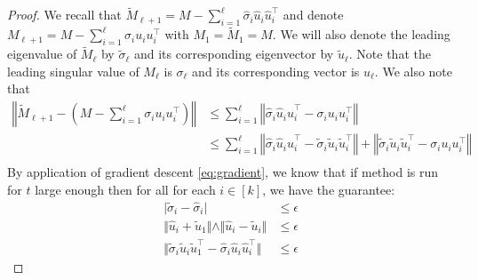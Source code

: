 \begin{proof}
    We recall that $\tilde{M}_{\ell+1} = M - \sum_{i=1}^\ell \hat{\sigma}_{i} \hat{u}_i \hat{u}_i^\top$ and denote $M_{\ell+1} = M - \sum_{i=1}^\ell \sigma_{i} u_i u_i^\top$ with $M_1 = \tilde{M}_1 = M$. We will also denote the leading eigenvalue of $\tilde{M}_\ell$ by $\tilde{\sigma}_\ell$ and its corresponding eigenvector by $\tilde{u}_\ell$. Note that the leading singular value of $M_\ell$ is $\sigma_\ell$ and its corresponding vector is $u_\ell$. We also note that  
    \begin{align}
        \left\Vert \tilde{M}_{\ell+1} - \left(M - \sum_{i=1}^\ell \sigma_i u_i u_i^\top\right) \right\Vert & \le  \sum_{i=1}^\ell 
        \left\Vert \hat{\sigma}_i \hat{u}_i \hat{u}_i^\top - \sigma_i u_i u_i^\top  \right\Vert   \\
        &  \le \sum_{i=1}^\ell 
        \left\Vert \hat{\sigma}_i \hat{u}_i \hat{u}_i^\top - \tilde{\sigma}_i \tilde{u}_i \tilde{u}_i^\top  \right\Vert  + \left\Vert \tilde{\sigma}_i \tilde{u}_i \tilde{u}_i^\top - \sigma_i u_i u_i^\top  \right\Vert   \label{eq:perturbed M}\\
    \end{align}
    By application of gradient descent \eqref{eq:gradient}, we know that if method is run for $t$ large enough then for all for each $i \in [k]$, we have the guarantee:
    \begin{align}
        \vert \tilde{\sigma}_i - \hat{\sigma}_i \vert & \le \epsilon  \\
        \Vert \hat{u}_i + \tilde{u}_1 \Vert \wedge \Vert \hat{u}_i - \tilde{u}_i \Vert & \le \epsilon \\
        \Vert \tilde{\sigma}_i \tilde{u}_i \tilde{u}_1^\top -  \hat{\sigma}_i  \hat{u}_i \hat{u}_i^\top \Vert & \le \epsilon
    \end{align}    
    

\end{proof}
